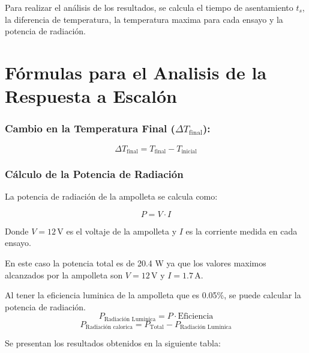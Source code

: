 \documentclass[spanish, a4paper, 11pt]{article}
\begin{document}
Para realizar el análisis de los resultados, se calcula el tiempo de asentamiento \( t_s \), la diferencia de temperatura, la temperatura maxima para cada ensayo y la potencia de radiación.

\newpage

\section*{Fórmulas para el Analisis de la Respuesta a Escalón}

\subsubsection*{Cambio en la Temperatura Final (\( \Delta T_{\text{final}} \)):}
\[
\Delta T_{\text{final}} = T_{\text{final}} - T_{\text{inicial}}
\]


\subsubsection*{Cálculo de la Potencia de Radiación}

La potencia de radiación de la ampolleta se calcula como:

\[
P = V \cdot I
\]

Donde \( V = 12 \, \text{V} \) es el voltaje de la ampolleta y \( I \) es la corriente medida en cada ensayo.

En este caso la potencia total es de 20.4 W ya que los valores maximos alcanzados por la ampolleta son \( V = 12 \, \text{V} \) y \( I = 1.7 \, \text{A} \).

Al tener la eficiencia luminica de la ampolleta que es 0.05\%, se puede calcular la potencia de radiación.
\[
P_{\text{Radiación Luminica}} = P \cdot \text{Eficiencia}
\]
\[
P_{\text{Radiación calorica}} = P_{\text{Total}} - P_{\text{Radiación Luminica}}
\]

Se presentan los resultados obtenidos en la siguiente tabla:

\begin{table}[ht]
    \caption{Resultados de los ensayos de temperatura sin ventilador. 
    }
\end{table}
\end{document}
